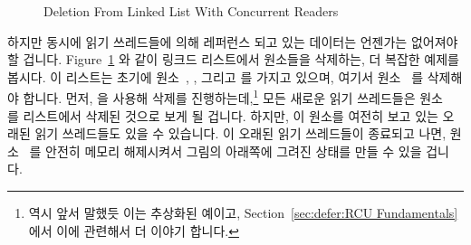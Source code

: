 \begin{figure}[tb]
\begin{center}
\end{center}
\caption{Deletion From Linked List With Concurrent Readers}
\label{fig:defer:Deletion From Linked List With Concurrent Readers}
\end{figure}

하지만 동시에 읽기 쓰레드들에 의해 레퍼런스 되고
있는 데이터는 언젠가는 없어져야 할 겁니다.
Figure~\ref{fig:defer:Deletion From Linked List With Concurrent Readers} 와
같이 링크드 리스트에서 원소들을 삭제하는, 더 복잡한 예제를 봅시다.
이 리스트는 초기에 원소~, , 그리고  를 가지고 있으며, 여기서
원소~ 를 삭제해야 합니다.
먼저,  을 사용해 삭제를 진행하는데,\footnote{
	역시 앞서 말했듯 이는 추상화된 예이고,
	Section~\ref{sec:defer:RCU Fundamentals} 에서 이에 관련해서 더 이야기
합니다.}
모든 새로운 읽기 쓰레드들은 원소~ 를 리스트에서 삭제된
것으로 보게 될 겁니다.
하지만, 이 원소를 여전히 보고 있는 오래된 읽기 쓰레드들도 있을 수
있습니다.
이 오래된 읽기 쓰레드들이 종료되고 나면, 원소~ 를 안전히 메모리
해제시켜서 그림의 아래쪽에 그려진 상태를 만들 수 있을 겁니다.
\iffalse

